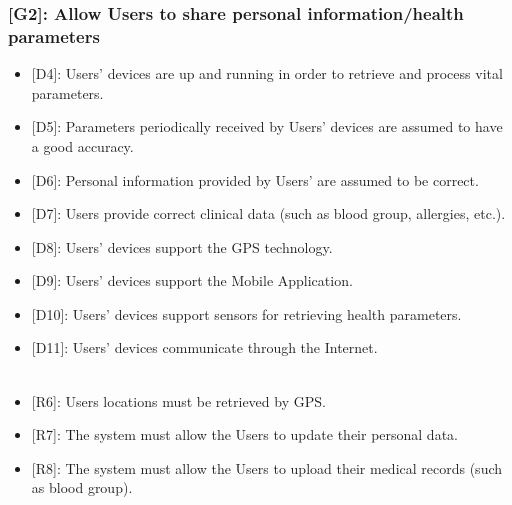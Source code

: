 \documentclass[12pt,a4paper]{article}
\begin{document}
	\subsubsection*{{[}{G2}{]}: Allow Users to share personal information/health parameters}
	\begin{itemize}
		\begin{itemize}
			\item {[D4]}: Users' devices are up and running in order to retrieve and process vital parameters.
			\item {[D5]}: Parameters periodically received by Users' devices are assumed to have a good accuracy.
			\item {[D6]}: Personal information provided by Users' are assumed to be correct.
			\item {[D7]}: Users provide correct clinical data (such as blood group, allergies, etc.).
			\item {[D8]}: Users' devices support the GPS technology.
			\item {[D9]}: Users' devices support the Mobile Application.
			\item {[D10]}: Users' devices support sensors for retrieving health parameters.
			\item {[D11]}: Users' devices communicate through the Internet.
			\\ \\
			\item {[R6]}: Users locations must be retrieved by GPS.
			\item {[R7]}: The system must allow the Users to update their personal data.
			\item {[R8]}: The system must allow the Users to upload their medical records (such as blood group).
		\end{itemize}
	\end{itemize}
\end{document}
